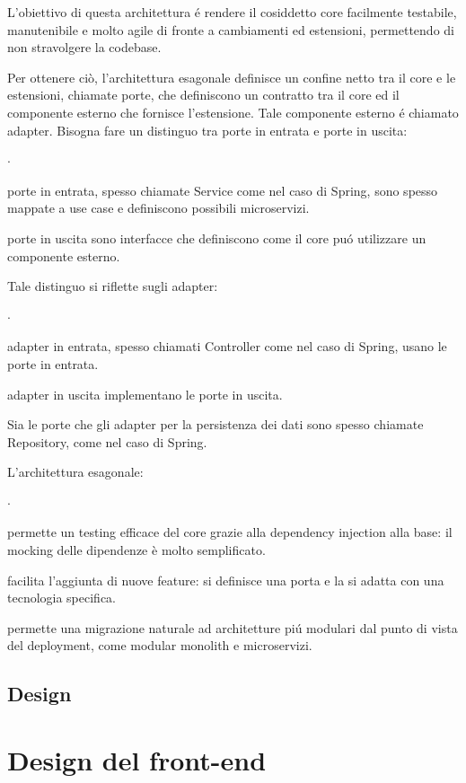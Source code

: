 L’obiettivo di questa architettura é rendere il cosiddetto core facilmente testabile, 
manutenibile e molto agile di fronte a cambiamenti ed estensioni, permettendo di non 
stravolgere la codebase.

Per ottenere ciò, l’architettura esagonale definisce un confine netto tra il core e 
le estensioni, chiamate porte, che definiscono un contratto tra il core ed il componente 
esterno che fornisce l’estensione. Tale componente esterno é chiamato adapter.
Bisogna fare un distinguo tra porte in entrata e porte in uscita:
\begin{list}{$\cdot$}{}
    \item porte in entrata, spesso chiamate Service come nel caso di Spring, sono spesso 
    mappate a use case e definiscono possibili microservizi.
    \item porte in uscita sono interfacce che definiscono come il core puó utilizzare 
    un componente esterno.
\end{list}

Tale distinguo si riflette sugli adapter:
\begin{list}{$\cdot$}{}
    \item adapter in entrata, spesso chiamati Controller come nel caso di Spring, 
    usano le porte in entrata.
    \item adapter in uscita implementano le porte in uscita.
\end{list}

Sia le porte che gli adapter per la persistenza dei dati sono spesso chiamate Repository, 
come nel caso di Spring.

L’architettura esagonale: 
\begin{list}{$\cdot$}{}
    \item permette un testing efficace del core grazie alla dependency injection 
    alla base: il mocking delle dipendenze è molto semplificato.
    \item facilita l’aggiunta di nuove feature: si definisce una porta e la si 
    adatta con una tecnologia specifica.
    \item permette una migrazione naturale ad architetture piú modulari dal punto 
    di vista del deployment, come modular monolith e microservizi.
\end{list}

\subsection{Design}

\section{Design del front-end}
